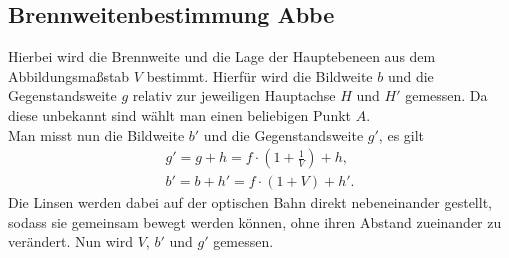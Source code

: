 \subsection{Brennweitenbestimmung Abbe}
Hierbei wird die Brennweite und die Lage der Hauptebeneen aus dem Abbildungsmaßstab $V$ bestimmt.
Hierfür wird die Bildweite $b$ und die Gegenstandsweite $g$ relativ zur jeweiligen Hauptachse $H$ und $H'$ gemessen.
Da diese unbekannt sind wählt man einen beliebigen Punkt $A$.\\
Man misst nun die Bildweite $b'$ und die Gegenstandsweite $g'$, es gilt
\begin{align}
    g'=g+h=f \cdot \left(1+\frac{1}{V}\right)+h, \label{eqn:abbe1}\\
    b'=b+h'=f \cdot \left(1+V\right)+h'. \label{eqn:abbe2}
\end{align}
Die Linsen werden dabei auf der optischen Bahn direkt nebeneinander gestellt, sodass sie gemeinsam bewegt werden können,
ohne ihren Abstand zueinander zu verändert. Nun wird $V$, $b'$ und $g'$ gemessen.
